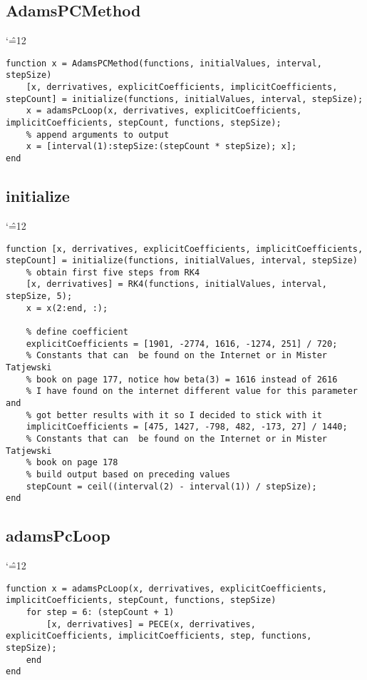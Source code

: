 \documentclass[12pt]{report}
\newenvironment{simplechar}{%
   \catcode`\^=12
}{}
\begin{document}
\subsection{AdamsPCMethod}
\begin{simplechar}
\begin{lstlisting}
function x = AdamsPCMethod(functions, initialValues, interval, stepSize)
    [x, derrivatives, explicitCoefficients, implicitCoefficients, stepCount] = initialize(functions, initialValues, interval, stepSize);
    x = adamsPcLoop(x, derrivatives, explicitCoefficients, implicitCoefficients, stepCount, functions, stepSize);
    % append arguments to output
    x = [interval(1):stepSize:(stepCount * stepSize); x];
end
\end{lstlisting}
\end{simplechar}

\subsection{initialize}
\begin{simplechar}
\begin{lstlisting}
function [x, derrivatives, explicitCoefficients, implicitCoefficients, stepCount] = initialize(functions, initialValues, interval, stepSize)
    % obtain first five steps from RK4
    [x, derrivatives] = RK4(functions, initialValues, interval, stepSize, 5);
    x = x(2:end, :);

    % define coefficient
    explicitCoefficients = [1901, -2774, 1616, -1274, 251] / 720;
    % Constants that can  be found on the Internet or in Mister Tatjewski
    % book on page 177, notice how beta(3) = 1616 instead of 2616
    % I have found on the internet different value for this parameter and
    % got better results with it so I decided to stick with it
    implicitCoefficients = [475, 1427, -798, 482, -173, 27] / 1440;
    % Constants that can  be found on the Internet or in Mister Tatjewski
    % book on page 178
    % build output based on preceding values
    stepCount = ceil((interval(2) - interval(1)) / stepSize);
end
\end{lstlisting}
\end{simplechar}

\subsection{adamsPcLoop}
\begin{simplechar}
\begin{lstlisting}
function x = adamsPcLoop(x, derrivatives, explicitCoefficients, implicitCoefficients, stepCount, functions, stepSize)
    for step = 6: (stepCount + 1)
        [x, derrivatives] = PECE(x, derrivatives, explicitCoefficients, implicitCoefficients, step, functions, stepSize);
    end
end
\end{lstlisting}
\end{simplechar}
\end{document}
